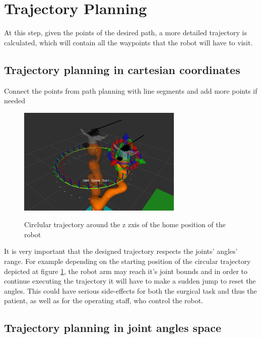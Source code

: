 \section{Trajectory Planning}

At this step, given the points of the desired path, a more detailed trajectory is calculated, 
which will contain all the waypoints that the robot will have to visit.

\subsection{Trajectory planning in cartesian coordinates}

Connect the points from path planning with line segments and add more points if needed

\begin{center}
\begin{figure}[H]
\centering
\includegraphics[width=0.7\textwidth]{images/simple_circular_traj1.png}\\
\caption{Circlular trajectory around the z zxis of the home position of the robot}
\label{fig:circ-traj-out-of-angle-range}
\end{figure}
\end{center}

It is very important that the designed trajectory respects the joints' angles' range. For example
depending on the starting position of the circular trajectory depicted at figure 
\ref{fig:circ-traj-out-of-angle-range}, the robot arm may reach it's joint bounds and in order to 
continue executing the trajectory it will have to make a sudden jump to reset the angles. 
This could have serious side-effects for both the surgical task and thus the patient, as well as 
for the operating staff, who control the robot.

\subsection{Trajectory planning in joint angles space}

